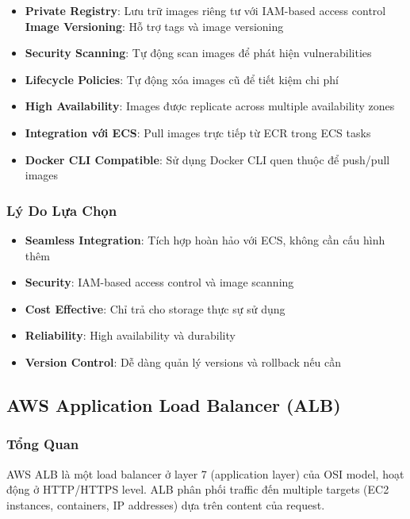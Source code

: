 \begin{itemize}
    \item \textbf{Private Registry}: Lưu trữ images riêng tư với IAM-based access control
    \textbf{Image Versioning}: Hỗ trợ tags và image versioning
    \item \textbf{Security Scanning}: Tự động scan images để phát hiện vulnerabilities
    \item \textbf{Lifecycle Policies}: Tự động xóa images cũ để tiết kiệm chi phí
    \item \textbf{High Availability}: Images được replicate across multiple availability zones
    \item \textbf{Integration với ECS}: Pull images trực tiếp từ ECR trong ECS tasks
    \item \textbf{Docker CLI Compatible}: Sử dụng Docker CLI quen thuộc để push/pull images
\end{itemize}

\subsubsection{Lý Do Lựa Chọn}

\begin{itemize}
    \item \textbf{Seamless Integration}: Tích hợp hoàn hảo với ECS, không cần cấu hình thêm
    \item \textbf{Security}: IAM-based access control và image scanning
    \item \textbf{Cost Effective}: Chỉ trả cho storage thực sự sử dụng
    \item \textbf{Reliability}: High availability và durability
    \item \textbf{Version Control}: Dễ dàng quản lý versions và rollback nếu cần
\end{itemize}

\subsection{AWS Application Load Balancer (ALB)}

\subsubsection{Tổng Quan}

AWS ALB là một load balancer ở layer 7 (application layer) của OSI model, hoạt động ở HTTP/HTTPS level. ALB phân phối traffic đến multiple targets (EC2 instances, containers, IP addresses) dựa trên content của request.

